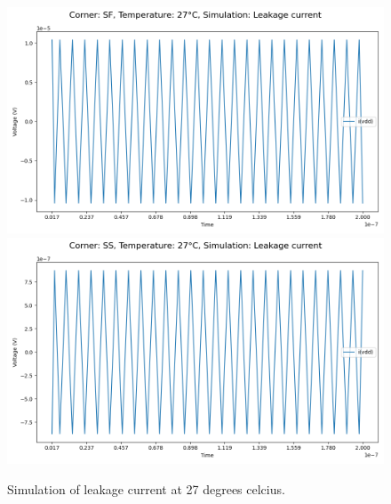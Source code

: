 \begin{figure}[H]
    \vspace{5pt}
    \includegraphics[height= 0.21\textheight]{figures/aimspice/SF/27/I.csv.png}
    \vspace{5pt}
    \includegraphics[height= 0.21\textheight]{figures/aimspice/SS/27/I.csv.png}
    \caption{Simulation of leakage current at 27 degrees celcius.}
    \label{fig:aimspice_I_27}
\end{figure}

\pagebreak

